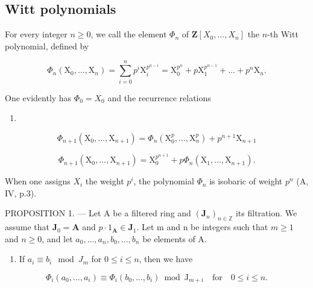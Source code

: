 \subsection{Witt polynomials}

For every integer \(n \geqslant 0\), we call the element \(\Phi_n\) of \(\mathbf{Z}[X_0, ..., X_n]\) the \(n\)-th Witt polynomial, defined by

\[
\Phi_ {n} \left(\mathrm{X} _ {0}, \dots , \mathrm{X} _ {n}\right) = \sum_ {i = 0} ^ {n} p ^ {i} \mathrm{X} _ {i} ^ {p ^ {n - i}} = \mathrm{X} _ {0} ^ {p ^ {n}} + p \mathrm{X} _ {1} ^ {p ^ {n - 1}} + \dots + p ^ {n} \mathrm{X} _ {n}.\tag{1}
\]

One evidently has \(\Phi_{0}=X_{0}\) and the recurrence relations

\begin{enumerate}
\def\labelenumi{(\arabic{enumi})}
\setcounter{enumi}{1}
\tightlist
\item
\end{enumerate}

\[
\Phi_ {n + 1} \left(\mathrm{X} _ {0}, \dots , \mathrm{X} _ {n + 1}\right) = \Phi_ {n} \left(\mathrm{X} _ {0} ^ {p}, \dots , \mathrm{X} _ {n} ^ {p}\right) + p ^ {n + 1} \mathrm{X} _ {n + 1}\tag{3}
\]

\[
\Phi_ {n + 1} \left(\mathrm{X} _ {0}, \dots , \mathrm{X} _ {n + 1}\right) = \mathrm{X} _ {0} ^ {p ^ {n + 1}} + p \Phi_ {n} \left(\mathrm{X} _ {1}, \dots , \mathrm{X} _ {n + 1}\right).
\]

When one assigns \(X_{i}\) the weight \(p^{i}\), the polynomial \(\Phi_{n}\) is isobaric of weight \(p^{n}\) (A, IV, p.3).

PROPOSITION 1. --- Let A be a filtered ring and \((\mathbf{J}_n)_{n\in \mathbb{Z}}\) its filtration. We assume that \(\mathbf{J}_0 = \mathbf{A}\) and \(p\cdot 1_{\mathbf{A}}\in \mathbf{J}_{1}\). Let m and n be integers such that \(m\geqslant 1\) and \(n\geqslant 0\), and let \(a_0,\dots,a_n,b_0,\dots,b_n\) be elements of A.

\begin{enumerate}
\def\labelenumi{\alph{enumi})}
\tightlist
\item
  If \(a_i \equiv b_i \mod J_m\) for \(0 \leqslant i \leqslant n\), then we have
\end{enumerate}

\[
\Phi_ {i} (a _ {0}, \dots , a _ {i}) \equiv \Phi_ {i} (b _ {0}, \dots , b _ {i}) \bmod \mathrm{J} _ {m + i} \quad \text{for} \quad 0 \leqslant i \leqslant n.
\]

